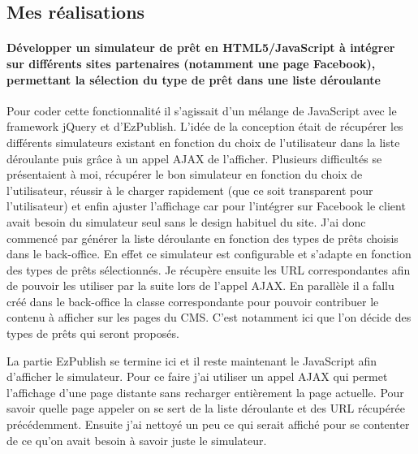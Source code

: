 \documentclass[a4paper,11pt,twoside]{report}
\begin{document}
    \subsection*{Mes réalisations}
      \paragraph*{Développer un simulateur de prêt en HTML5/JavaScript à intégrer sur différents sites partenaires (notamment une page Facebook), permettant la sélection du type de prêt dans une liste déroulante}
      Pour coder cette fonctionnalité il s'agissait d'un mélange de JavaScript avec le framework jQuery et d'EzPublish. L'idée de la conception était de récupérer les différents simulateurs existant en fonction du choix de l'utilisateur dans la liste déroulante puis grâce à un appel AJAX de l'afficher. Plusieurs difficultés se présentaient à moi, récupérer le bon simulateur en fonction du choix de l'utilisateur, réussir à le charger rapidement (que ce soit transparent pour l'utilisateur) et enfin ajuster l'affichage car pour l'intégrer sur Facebook le client avait besoin du simulateur seul sans le design habituel du site. J'ai donc commencé par générer la liste déroulante en fonction des types de prêts choisis dans le back-office. En effet ce simulateur est configurable et s'adapte en fonction des types de prêts sélectionnés. Je récupère ensuite les URL correspondantes afin de pouvoir les utiliser par la suite lors de l'appel AJAX. En parallèle il a fallu créé dans le back-office la classe correspondante pour pouvoir contribuer le contenu à afficher sur les pages du CMS. C'est notamment ici que l'on décide des types de prêts qui seront proposés.
      \label{global_loan_simulator_1}
      
      La partie EzPublish se termine ici et il reste maintenant le JavaScript afin d'afficher le simulateur. Pour ce faire j'ai utiliser un appel AJAX qui permet l'affichage d'une page distante sans recharger entièrement la page actuelle. Pour savoir quelle page appeler on se sert de la liste déroulante et des URL récupérée précédemment. Ensuite j'ai nettoyé un peu ce qui serait affiché pour se contenter de ce qu'on avait besoin à savoir juste le simulateur.
      \label{global_loan_simulator_2}
\end{document}
